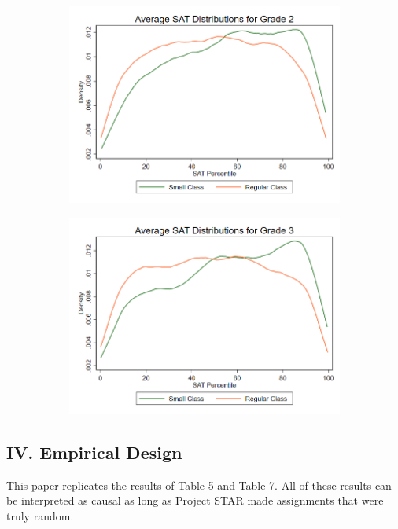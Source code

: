\documentclass[a4paper,11pt]{article}
\begin{document}
\begin{figure}[H]
\begin{subfigure}{0.5\textwidth}
	\includegraphics[width=\linewidth]{figure1_2.png}
\end{subfigure}
\begin{subfigure}{0.5\textwidth}
	\includegraphics[width=\linewidth]{figure1_3.png}
\end{subfigure}
\end{figure} 



\subsection*{IV. Empirical Design}
This paper replicates the results of Table 5 and Table 7. All of these results can be interpreted as causal as long as Project STAR made assignments that were truly random. \par
\end{document}
